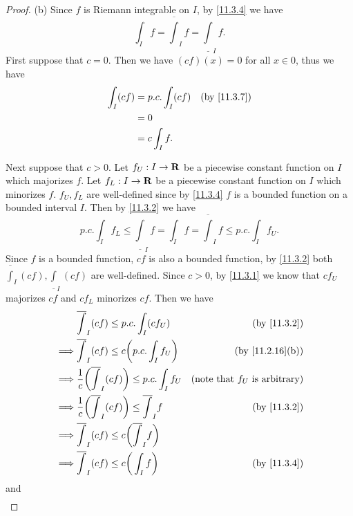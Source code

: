 \begin{proof}{(b)}
  Since \(f\) is Riemann integrable on \(I\), by \cref{11.3.4} we have
  \[
    \int_I f = \overline{\int}_I f = \underline{\int}_I f.
  \]
  First suppose that \(c = 0\).
  Then we have \((cf)(x) = 0\) for all \(x \in 0\), thus we have
  \begin{align*}
    \int_I (cf) & = p.c. \int_I (cf) & \text{(by \cref{11.3.7})} \\
                & = 0                                            \\
                & = c \int_I f.
  \end{align*}

  Next suppose that \(c > 0\).
  Let \(f_U : I \to \mathbf{R}\) be a piecewise constant function on \(I\) which majorizes \(f\).
  Let \(f_L : I \to \mathbf{R}\) be a piecewise constant function on \(I\) which minorizes \(f\).
  \(f_U, f_L\) are well-defined since by \cref{11.3.4} \(f\) is a bounded function on a bounded interval \(I\).
  Then by \cref{11.3.2} we have
  \[
    p.c. \int_I f_L \leq \underline{\int}_I f = \int_I f = \overline{\int}_I f \leq p.c. \int_I f_U.
  \]
  Since \(f\) is a bounded function, \(cf\) is also a bounded function, by \cref{11.3.2} both \(\overline{\int}_I (cf), \underline{\int}_I (cf)\) are well-defined.
  Since \(c > 0\), by \cref{11.3.1} we know that \(c f_U\) majorizes \(c f\) and \(c f_L\) minorizes \(c f\).
  Then we have
  \begin{align*}
             & \overline{\int}_I (cf) \leq p.c. \int_I (c f_U)                         & \text{(by \cref{11.3.2})}               \\
    \implies & \overline{\int}_I (cf) \leq c \bigg(p.c. \int_I f_U\bigg)               & \text{(by \cref{11.2.16}(b))}           \\
    \implies & \frac{1}{c} \bigg(\overline{\int}_I (cf)\bigg) \leq p.c. \int_I f_U     & \text{(note that \(f_U\) is arbitrary)} \\
    \implies & \frac{1}{c} \bigg(\overline{\int}_I (cf)\bigg) \leq \overline{\int}_I f & \text{(by \cref{11.3.2})}               \\
    \implies & \overline{\int}_I (cf) \leq c\bigg(\overline{\int}_I f\bigg)                                                      \\
    \implies & \overline{\int}_I (cf) \leq c\bigg(\int_I f\bigg)                       & \text{(by \cref{11.3.4})}
  \end{align*}
  and
  \begin{align*}

\end{align*}
\end{proof}
